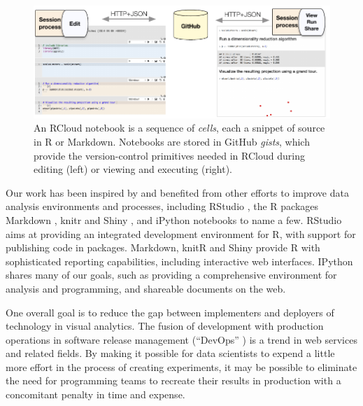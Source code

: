 \begin{figure}
\centering
\includegraphics[width=.8\linewidth]{fig/notebook/notebook.pdf}
\caption{\label{fig:notebook}An RCloud notebook is a sequence of
  \emph{cells}, each a snippet of source in R or Markdown. Notebooks
  are stored in GitHub \emph{gists}, which provide the version-control
  primitives needed in RCloud during editing (left) or viewing and
  executing (right).}
\end{figure}

Our work has been inspired by and benefited from other efforts
to improve data analysis environments and processes,
including RStudio \cite{RStudio:2013:SWA},
the R packages Markdown \cite{Allaire:2014:MMR},
knitr \cite{Xie:2013:DDW}
and Shiny \cite{RStudio:2013:SWA},
and iPython notebooks \cite{Perez:2007:IAS}
to name a few. RStudio aims at providing an integrated development environment
for R, with support for publishing code in packages. Markdown,
knitR and Shiny provide R with sophisticated reporting capabilities, including
interactive web interfaces. IPython \cite{Perez:2007:IAS}
shares many of our goals, such as providing a comprehensive environment
for analysis and programming, and shareable documents on the web.

One overall goal is to reduce the gap between implementers and deployers
of technology in visual analytics. The fusion of development with production
operations in software release management (``DevOps'' \cite{Httermann:2012:DD})
is a trend in web services and related fields. By making it possible
for data scientists to expend a little more effort in the process of
creating experiments, it may be possible to eliminate the need for
programming teams to recreate their results in production with
a concomitant penalty in time and expense.
